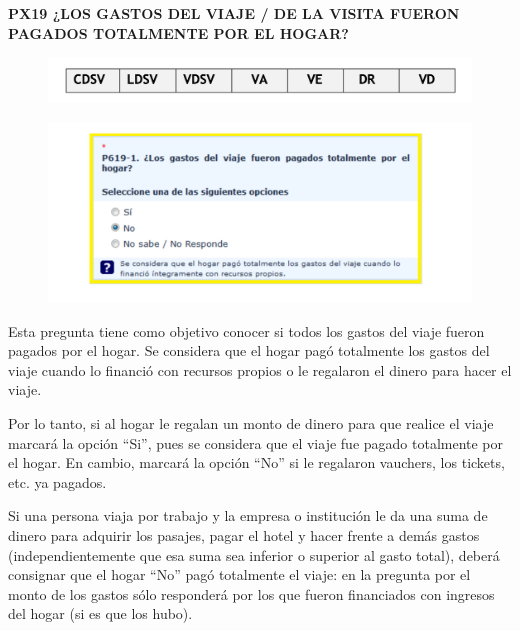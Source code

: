 \documentclass[
  openany]{book}
\begin{document}
\textbf{PX19 ¿LOS GASTOS DEL VIAJE / DE LA VISITA FUERON PAGADOS TOTALMENTE POR EL HOGAR?}

\begin{figure}

{\centering \includegraphics[width=1\linewidth]{imagenes/figura6-117} 

}

\end{figure}

\begin{figure}

{\centering \includegraphics[width=1\linewidth]{imagenes/figura6-118} 

}

\end{figure}

Esta pregunta tiene como objetivo conocer si todos los gastos del viaje fueron pagados por el hogar. Se considera que el hogar pagó totalmente los gastos del viaje cuando lo financió con recursos propios o le regalaron el dinero para hacer el viaje.

Por lo tanto, si al hogar le regalan un monto de dinero para que realice el viaje marcará la opción ``Si'', pues se considera que el viaje fue pagado totalmente por el hogar. En cambio, marcará la opción ``No'' si le regalaron vauchers, los tickets, etc. ya pagados.

Si una persona viaja por trabajo y la empresa o institución le da una suma de dinero para adquirir los pasajes, pagar el hotel y hacer frente a demás gastos (independientemente que esa suma sea inferior o superior al gasto total), deberá consignar que el hogar ``No'' pagó totalmente el viaje: en la pregunta por el monto de los gastos sólo responderá por los que fueron financiados con ingresos del hogar (si es que los hubo).
\end{document}

